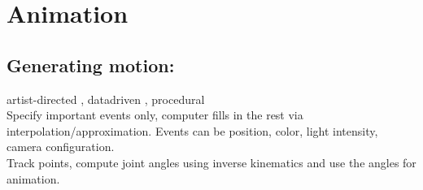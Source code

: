 \section{Animation}
\subsection*{Generating motion:} 
artist-directed , datadriven , procedural \\
 Specify important events only, computer fills in the rest via interpolation/approximation. Events can be position, color, light intensity, camera configuration.\\
 Track points, compute joint angles using inverse kinematics and use the angles for animation.